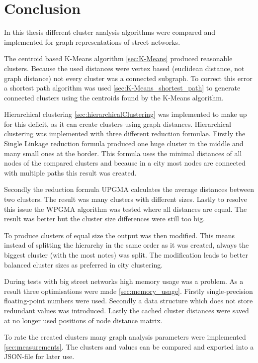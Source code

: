 \chapter{Conclusion}
In this thesis different cluster analysis algorithms were compared and implemented for graph representations of street networks.

The centroid based K-Means algorithm \ref{sec:K-Means} produced reasonable clusters. Because the used distances were vertex based (euclidean distance, not graph distance) not every cluster was a connected subgraph. To correct this error a shortest path algorithm was used \ref{sec:K-Means_shortest_path} to generate connected clusters using the centroids found by the K-Means algorithm.

Hierarchical clustering \ref{sec:hierarchicalClustering} was implemented to make up for this deficit, as it can create clusters using graph distances. Hierarchical clustering was implemented with three different reduction formulae. Firstly the Single Linkage reduction formula produced one huge cluster in the middle and many small ones at the border. This formula uses the minimal distances of all nodes of the compared clusters and because in a city most nodes are connected with multiple paths this result was created.

Secondly the reduction formula \gls{UPGMA} calculates the average distances between two clusters. The result was many clusters with different sizes. Lastly to resolve this issue the \gls{WPGMA} algorithm was tested where all distances are equal. The result was better but the cluster size differences were still too big.

To produce clusters of equal size the output was then modified. This means instead of splitting the hierarchy in the same order as it was created, always the biggest cluster (with the most notes) was split. The modification leads to better balanced cluster sizes as preferred in city clustering.

During tests with big street networks high memory usage was a problem. As a result three optimisations were made \ref{sec:memory_usage}. Firstly single-precision floating-point numbers were used. Secondly a data structure which does not store redundant values was introduced. Lastly the cached cluster distances were saved at no longer used positions of node distance matrix.

To rate the created clusters many graph analysis parameters were implemented \ref{sec:measurements}. The clusters and values can be compared and exported into a JSON-file for later use.